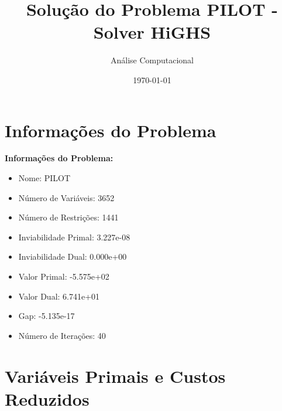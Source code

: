 \documentclass[12pt]{article}
\title{Solução do Problema PILOT - Solver HiGHS}
\author{Análise Computacional}
\date{\today}
\begin{document}
\maketitle

\section{Informações do Problema}

\textbf{Informações do Problema:}
\begin{itemize}
\item Nome: PILOT
\item Número de Variáveis: 3652
\item Número de Restrições: 1441
\item Inviabilidade Primal: 3.227e-08
\item Inviabilidade Dual: 0.000e+00
\item Valor Primal: -5.575e+02
\item Valor Dual: 6.741e+01
\item Gap: -5.135e-17
\item Número de Iterações: 40
\end{itemize}


\section{Variáveis Primais e Custos Reduzidos}
\end{document}
